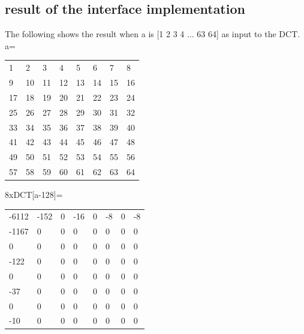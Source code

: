 \documentclass[a4paper]{article}
\begin{document}
\subsection{result of the interface implementation}
The following shows the result when a is [1 2 3 4 ... 63 64] as input to the DCT.
a=  \newline  \newline
\begin{tabular}{l l l l l l l l}
1 & 2 & 3 & 4 & 5 & 6 & 7 & 8 \\
9  &  10  &  11   & 12 &   13  &  14 &   15 &   16  \\
17   & 18  &  19  &  20  &  21  &  22  &  23  &  24  \\
25  &  26  &  27  &  28  &  29  &  30  &  31  &  32  \\
33  &  34  &  35  &  36  &  37  &  38  &  39  &  40  \\
41  &  42  &  43  &  44  &  45  &  46  &  47  &  48  \\
49  &  50  &  51  &  52  &  53  &  54 &   55  &  56  \\
57   & 58  &  59  &  60  &  61 &   62  &  63  &  64  \\
\end{tabular}
 \newline  \newline  \newline
8xDCT[a-128]=  \newline  \newline
\begin{tabular}{l l l l l l l l}
-6112  & -152   &   0   & -16   &   0  &   -8   &   0  &   -8 \\
-1167   &   0    &  0   &   0   &   0   &   0   &   0  &    0 \\
    0   &   0   &   0   &   0    &  0   &   0    &  0   &   0 \\
 -122  &    0   &   0   &   0   &   0   &   0    &  0   &   0 \\
    0    &  0   &   0   &   0    &  0   &   0    &  0   &   0 \\
  -37   &   0   &   0   &   0   &   0   &   0   &   0   &   0 \\
    0   &   0   &   0   &   0  &    0   &   0   &   0   &   0 \\
  -10   &   0   &   0  &    0   &   0   &   0   &   0   &   0 \\

\end{tabular}
 \newline  \newline  \newline
\end{document}
